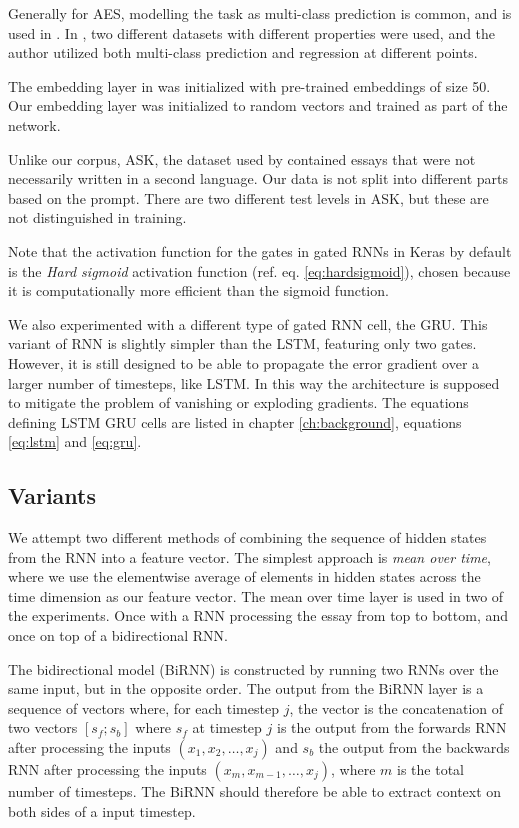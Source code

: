 Generally for \ac{AES}, modelling the task as multi-class prediction is
common, and is used in \autocite{vajjala18universalCEFR}. In
\autocite{vajjala17}, two different datasets with different properties were
used, and the author utilized both multi-class prediction and regression at
different points.

The embedding layer in \textcite{taghipour16} was initialized with
pre-trained embeddings of size 50. Our embedding layer was initialized to
random vectors and trained as part of the network.

Unlike our corpus, ASK, the dataset used by \citeauthor{taghipour16}
contained essays that were not necessarily written in a second language. Our
data is not split into different parts based on the prompt. There are two
different test levels in ASK, but these are not distinguished in training.

Note that the activation function for the gates in gated RNNs in Keras by
default is the \emph{Hard sigmoid} activation function (ref. eq.
\ref{eq:hardsigmoid}), chosen because it is computationally more efficient
than the sigmoid function.

We also experimented with a different type of gated \ac{RNN} cell, the
\ac{GRU}. This variant of \ac{RNN} is slightly simpler than the \ac{LSTM},
featuring only two gates. However, it is still designed to be able to
propagate the error gradient over a larger number of timesteps, like
\ac{LSTM}. In this way the architecture is supposed to mitigate the problem
of vanishing or exploding gradients. The equations defining \ac{LSTM}
\ac{GRU} cells are listed in chapter \ref{ch:background}, equations
\ref{eq:lstm} and \ref{eq:gru}.


\subsection{Variants}

We attempt two different methods of combining the sequence of hidden states
from the \ac{RNN} into a feature vector. The simplest approach is \emph{mean
over time}, where we use the elementwise average of elements in hidden states
across the time dimension as our feature vector. The mean over time layer is
used in two of the experiments. Once with a \ac{RNN} processing the essay
from top to bottom, and once on top of a bidirectional RNN.

The bidirectional model (BiRNN) is constructed by running two \acp{RNN} over
the same input, but in the opposite order. The output from the BiRNN layer is
a sequence of vectors where, for each timestep $j$, the vector is the
concatenation of two vectors $[s_f;s_b]$ where $s_f$ at timestep $j$ is the
output from the forwards \ac{RNN} after processing the inputs $(x_1, x_2,
\ldots, x_j)$ and $s_b$ the output from the backwards \ac{RNN} after
processing the inputs $(x_m, x_{m-1}, \ldots, x_j)$, where $m$ is the total
number of timesteps. The BiRNN should therefore be able to extract context on
both sides of a input timestep.

